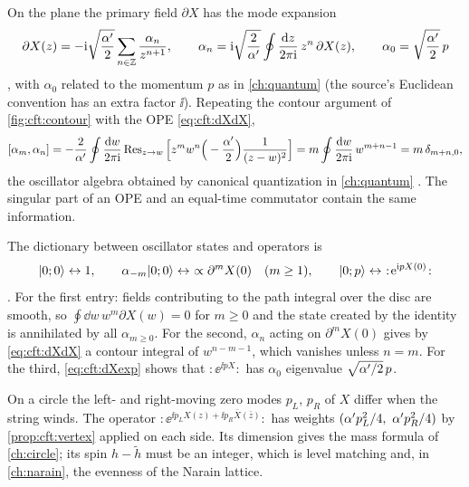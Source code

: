 On the plane the primary field $\partial X$ has the mode expansion
\begin{equation}\label{eq:cft:dXmodes}
  \partial X(z)=-\mathrm{i}\sqrt{\frac{\alpha'}2}\sum_{n\in\mathbb{Z}}\frac{\alpha_n}{z^{n+1}},\qquad
  \alpha_n=\mathrm{i}\sqrt{\frac2{\alpha'}}\oint\frac{\mathrm{d} z}{2\pi\mathrm{i}}\,z^n\,\partial X(z),\qquad
  \alpha_0=\sqrt{\frac{\alpha'}2}\,p
\end{equation}
, with $\alpha_0$ related to the momentum $p$ as in
\cref{ch:quantum} (the source's Euclidean convention has an extra factor $\ii$). Repeating the contour argument of
\cref{fig:cft:contour} with the OPE \eqref{eq:cft:dXdX},
\begin{equation}\label{eq:cft:alphacomm}
  [\alpha_m,\alpha_n]=-\frac{2}{\alpha'}\oint\frac{\mathrm{d} w}{2\pi\mathrm{i}}\operatorname{Res}_{z\to w}
  \Big[z^mw^n\Big(-\frac{\alpha'}{2}\Big)\frac{1}{(z-w)^2}\Big]
  =m\oint\frac{\mathrm{d} w}{2\pi\mathrm{i}}\,w^{m+n-1}=m\,\delta_{m+n,0},
\end{equation}
the oscillator algebra obtained by canonical quantization in \cref{ch:quantum}
. The singular part of an OPE and an equal-time commutator
contain the same information.

The dictionary between oscillator states and operators is
\begin{equation}\label{eq:cft:dictionary}
  \ket{0;0}\leftrightarrow 1,\qquad
  \alpha_{-m}\ket{0;0}\leftrightarrow\ \propto\partial^mX(0)\quad(m\ge1),\qquad
  \ket{0;p}\leftrightarrow\ :\!\ee^{\ii pX(0)}\!:
\end{equation}
. For the first entry: fields contributing to the path
integral over the disc are smooth, so $\oint\dd w\,w^m\partial X(w)=0$ for $m\ge0$ and the state
created by the identity is annihilated by all $\alpha_{m\ge0}$. For the second, $\alpha_n$ acting
on $\partial^mX(0)$ gives by \eqref{eq:cft:dXdX} a contour integral of $w^{n-m-1}$, which vanishes
unless $n=m$. For the third, \eqref{eq:cft:dXexp} shows that $:\!\ee^{\ii pX}\!:$ has $\alpha_0$
eigenvalue $\sqrt{\alpha'/2}\,p$.

\begin{physicsbox}
On a circle the left- and right-moving zero modes $p_L$, $p_R$ of $X$ differ when the string
winds. The operator $:\!\ee^{\ii p_LX(z)+\ii p_R\bar X(\bar z)}\!:$ has weights
$(\alpha' p_L^2/4,\ \alpha' p_R^2/4)$ by \cref{prop:cft:vertex} applied on each side. Its dimension gives
the mass formula of \cref{ch:circle}; its spin $h-\tilde h$ must be an integer, which is level
matching and, in \cref{ch:narain}, the evenness of the Narain lattice.
\end{physicsbox}


